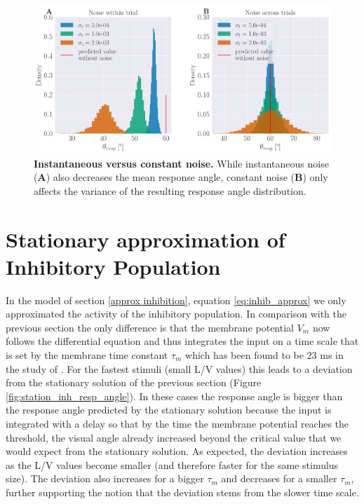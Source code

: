 \documentclass[a4paper,10pt,hidelinks]{scrreprt}
\begin{document}
    \begin{figure}[H]
    	\begin{center}
			\includegraphics[width=\textwidth, height=0.25\textheight]{figure_static_vs_dynamic_noise.pdf}
    	\end{center}
    	\caption{\textbf{Instantaneous versus constant noise.} While instantaneous noise (\textbf{A}) also decreases the mean response angle, constant noise (\textbf{B}) only affects the variance of the resulting response angle distribution.}
    	\label{fig:static_vs_dynamic_noise}
    \end{figure}

    \section{Stationary approximation of Inhibitory Population}
    In the model of section \ref{approx inhibition}, equation \ref{eq:inhib_approx} we only approximated the activity of the inhibitory population.
    In comparison with the previous section the only difference is that the membrane potential $V_{m}$ now follows the differential equation and thus integrates the input on a time scale that is set by the membrane time constant $\tau_m$ which has been found to be 23 ms in the study of \cite{Koyama2016}.
    For the fastest stimuli (small L/V values) this leads to a deviation from the stationary solution of the previous section (Figure \ref{fig:station_inh_resp_angle}).
    In these cases the response angle is bigger than the response angle predicted by the stationary solution because the input is integrated with a delay so that by the time the membrane potential reaches the threshold, the visual angle already increased beyond the critical value that we would expect from the stationary solution.
    As expected, the deviation increases as the L/V values become smaller (and therefore faster for the same stimulus size).
    The deviation also increases for a bigger $\tau_m$ and decreases for a smaller $\tau_m$, further supporting the notion that the deviation stems from the slower time scale.
        
\end{document}
